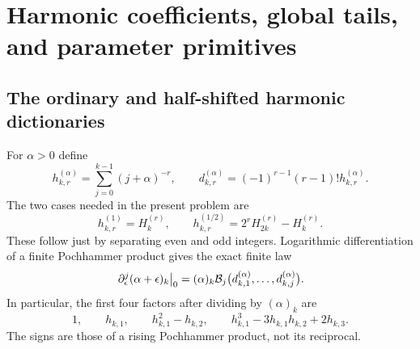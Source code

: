 \section{Harmonic coefficients, global tails, and parameter primitives}
\label{qspec:sec:harmonic}

\subsection{The ordinary and half-shifted harmonic dictionaries}
For $\alpha>0$ define
\begin{equation}\label{qspec:eq:shifted-harmonics}
h_{k,r}^{(\alpha)}=\sum_{j=0}^{k-1}(j+\alpha)^{-r},\qquad
 d_{k,r}^{(\alpha)}=(-1)^{r-1}(r-1)!h_{k,r}^{(\alpha)}.
\end{equation}
The two cases needed in the present problem are
\begin{equation}\label{qspec:eq:harmonic-dictionaries}
h_{k,r}^{(1)}=H_k^{(r)},\qquad
h_{k,r}^{(1/2)}=2^r H_{2k}^{(r)}-H_k^{(r)}.
\end{equation}
These follow just by separating even and odd integers. Logarithmic
differentiation of a finite Pochhammer product gives the exact finite law
\begin{equation}\label{qspec:eq:pochhammer-jet}
\left.\partial_\epsilon^j(\alpha+\epsilon)_k\right|_0
=(\alpha)_k\mathcal B_j\bigl(d_{k,1}^{(\alpha)},\ldots,d_{k,j}^{(\alpha)}\bigr).
\end{equation}
In particular, the first four factors after dividing by $(\alpha)_k$ are
\[
1,\qquad h_{k,1},\qquad h_{k,1}^2-h_{k,2},\qquad
h_{k,1}^3-3h_{k,1}h_{k,2}+2h_{k,3}.
\]
The signs are those of a rising Pochhammer product, not its reciprocal.

